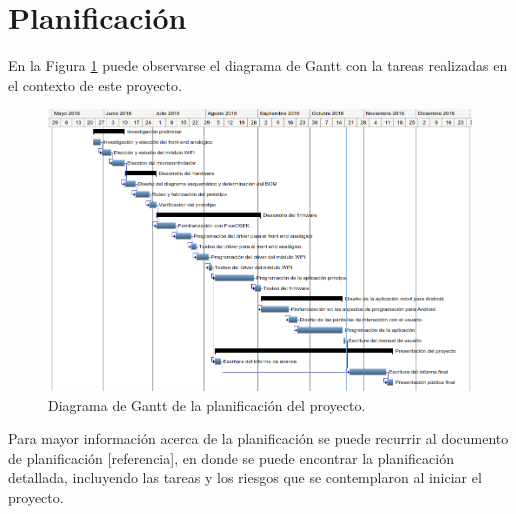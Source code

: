 \section{Planificación}

En la Figura \ref{fig:diagrama_gantt} puede observarse el diagrama de Gantt con la tareas realizadas en el contexto de este proyecto.

\begin{figure}[!h]
	\centering
	\includegraphics[width=18cm, angle=90]{./Figures/2_3_diagrama-Gantt.png}
	\caption{Diagrama de Gantt de la planificación del proyecto.}
	\label{fig:diagrama_gantt}
\end{figure}

Para mayor información acerca de la planificación se puede recurrir al documento de planificación [referencia], en donde se puede encontrar la planificación detallada, incluyendo las tareas y los riesgos que se contemplaron al iniciar el proyecto.
